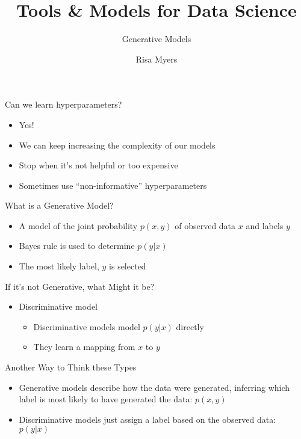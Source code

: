 \documentclass[aspectratio=169]{beamer}
\title[]
{Tools \& Models for Data Science}
\subtitle{Generative Models}
\author[]{Risa Myers}
\institute
{
  Rice University 
}
\date[]{}
\begin{document}
\begin{frame}
 \titlepage
\end{frame}
\begin{frame}{Can we learn hyperparameters?}

\begin{itemize}
	\item Yes!
	\item We can keep increasing the complexity of our models
	\item Stop when it's not helpful or too expensive
	\item Sometimes use ``non-informative'' hyperparameters
\end{itemize}
\end{frame}
\begin{frame}{What is a Generative Model?}

\begin{itemize}
	\item A model of the joint probability $p(x,y)$ of observed data $x$ and labels $y$
	\item Bayes rule is used to determine $p(y|x)$
	\item The most likely label, $y$ is selected
\end{itemize}
\end{frame}
\begin{frame}{If it's not Generative, what Might it be?}

\begin{itemize}
	\item Discriminative model
	\begin{itemize}
	\item Discriminative models model $p(y|x)$ directly
	\item They learn a mapping from $x$ to $y$
	\end{itemize}
\end{itemize}
\end{frame}
\begin{frame}{Another Way to Think these Types}

\begin{itemize}
	\item Generative models describe how the data were generated, inferring which label is most likely to have generated the data: $p(x,y)$
	\item Discriminative models just assign a label based on the observed data: $p(y|x)$
\end{itemize}
\end{frame}
\end{document}
